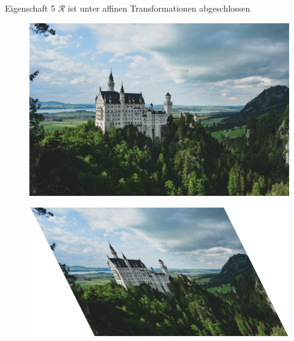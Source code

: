\documentclass[10pt]{beamer}
\begin{document}
\begin{frame}{Eigenschaft 5}
  \( \mathcal{R} \) ist unter affinen Transformationen abgeschlossen

  \begin{minipage}{.375\textwidth}
    \begin{figure}
      \includegraphics[width=\textwidth]{neuschwanstein}
    \end{figure}
  \end{minipage}
  \hfill
  \begin{minipage}{.525\textwidth}
    \begin{figure}
      \includegraphics[width=\textwidth]{neuschwanstein-skewed}
    \end{figure}
  \end{minipage}
\end{frame}
\end{document}

